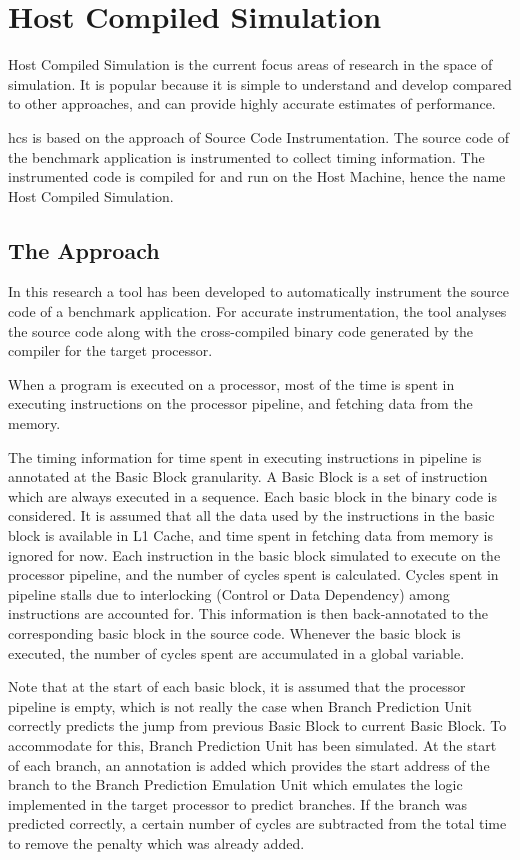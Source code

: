 \chapter{Host Compiled Simulation}

Host Compiled Simulation is the current focus areas of research in the space of simulation. It is popular because it is simple to understand and develop compared to other approaches, and can provide highly accurate estimates of performance.

\gls{hcs} is based on the approach of Source Code Instrumentation. The source code of the benchmark application is instrumented to collect timing information. The instrumented code is compiled for and run on the Host Machine, hence the name Host Compiled Simulation.

\section{The Approach}
In this research a tool has been developed to automatically instrument the source code of a benchmark application. For accurate instrumentation, the tool analyses the source code along with the cross-compiled binary code generated by the compiler for the target processor.

When a program is executed on a processor, most of the time is spent in executing instructions on the processor pipeline, and fetching data from the memory.

The timing information for time spent in executing instructions in pipeline is annotated at the Basic Block granularity. A Basic Block is a set of instruction which are always executed in a sequence. Each basic block in the binary code is considered. It is assumed that all the data used by the instructions in the basic block is available in L1 Cache, and time spent in fetching data from memory is ignored for now. Each instruction in the basic block simulated to execute on the processor pipeline, and the number of cycles spent is calculated. Cycles spent in pipeline stalls due to interlocking (Control or Data Dependency) among instructions are accounted for. This information is then back-annotated to the corresponding basic block in the source code. Whenever the basic block is executed, the number of cycles spent are accumulated in a global variable. 

Note that at the start of each basic block, it is assumed that the processor pipeline is empty, which is not really the case when Branch Prediction Unit correctly predicts the jump from previous Basic Block to current Basic Block. To accommodate for this, Branch Prediction Unit has been simulated. At the start of each branch, an annotation is added which provides the start address of the branch to the Branch Prediction Emulation Unit which emulates the logic implemented in the target processor to predict branches. If the branch was predicted correctly, a certain number of cycles are subtracted from the total time to remove the penalty which was already added. 

